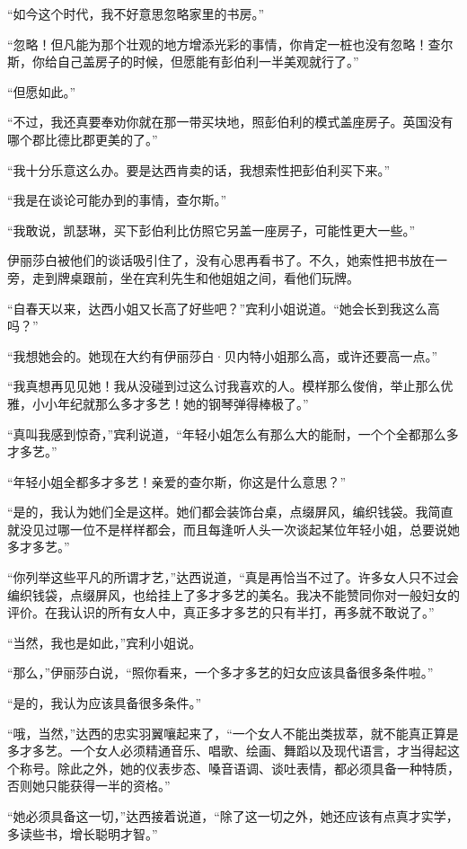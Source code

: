 \par “如今这个时代，我不好意思忽略家里的书房。”
\par “忽略！但凡能为那个壮观的地方增添光彩的事情，你肯定一桩也没有忽略！查尔斯，你给自己盖房子的时候，但愿能有彭伯利一半美观就行了。”
\par “但愿如此。”
\par “不过，我还真要奉劝你就在那一带买块地，照彭伯利的模式盖座房子。英国没有哪个郡比德比郡更美的了。”
\par “我十分乐意这么办。要是达西肯卖的话，我想索性把彭伯利买下来。”
\par “我是在谈论可能办到的事情，查尔斯。”
\par “我敢说，凯瑟琳，买下彭伯利比仿照它另盖一座房子，可能性更大一些。”
\par 伊丽莎白被他们的谈话吸引住了，没有心思再看书了。不久，她索性把书放在一旁，走到牌桌跟前，坐在宾利先生和他姐姐之间，看他们玩牌。
\par “自春天以来，达西小姐又长高了好些吧？”宾利小姐说道。“她会长到我这么高吗？”
\par “我想她会的。她现在大约有伊丽莎白·贝内特小姐那么高，或许还要高一点。”
\par “我真想再见见她！我从没碰到过这么讨我喜欢的人。模样那么俊俏，举止那么优雅，小小年纪就那么多才多艺！她的钢琴弹得棒极了。”
\par “真叫我感到惊奇，”宾利说道，“年轻小姐怎么有那么大的能耐，一个个全都那么多才多艺。”
\par “年轻小姐全都多才多艺！亲爱的查尔斯，你这是什么意思？”
\par “是的，我认为她们全是这样。她们都会装饰台桌，点缀屏风，编织钱袋。我简直就没见过哪一位不是样样都会，而且每逢听人头一次谈起某位年轻小姐，总要说她多才多艺。”
\par “你列举这些平凡的所谓才艺，”达西说道，“真是再恰当不过了。许多女人只不过会编织钱袋，点缀屏风，也给挂上了多才多艺的美名。我决不能赞同你对一般妇女的评价。在我认识的所有女人中，真正多才多艺的只有半打，再多就不敢说了。”
\par “当然，我也是如此，”宾利小姐说。
\par “那么，”伊丽莎白说，“照你看来，一个多才多艺的妇女应该具备很多条件啦。”
\par “是的，我认为应该具备很多条件。”
\par “哦，当然，”达西的忠实羽翼嚷起来了，“一个女人不能出类拔萃，就不能真正算是多才多艺。一个女人必须精通音乐、唱歌、绘画、舞蹈以及现代语言，才当得起这个称号。除此之外，她的仪表步态、嗓音语调、谈吐表情，都必须具备一种特质，否则她只能获得一半的资格。”
\par “她必须具备这一切，”达西接着说道，“除了这一切之外，她还应该有点真才实学，多读些书，增长聪明才智。”
